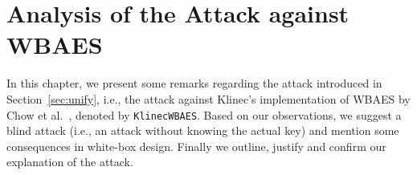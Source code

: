 \chapter{Analysis of the Attack against WBAES}
\label{chap:analysis}

In this chapter, we present some remarks regarding the attack introduced in Section~\ref{sec:unify}, i.e., the attack against Klinec's implementation \cite{klinec2013implementation} of WBAES by Chow et al.\ \cite{chow2002aes}, denoted by {\tt KlinecWBAES}. Based on our observations, we suggest a blind attack (i.e., an attack without knowing the actual key) and mention some consequences in white-box design. Finally we outline, justify and confirm our explanation of the attack.








